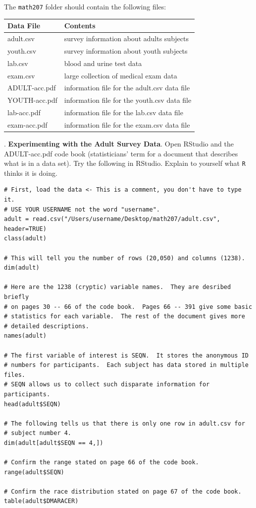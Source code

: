 \documentclass[10pt]{article}
\newcounter{EX}\setcounter{EX}{1}
\newcommand{\EXERCISE}{\arabic{EX}.\stepcounter{EX} }
\begin{document}
The \texttt{math207} folder should contain the following files:\vspace{-6pt}
\begin{center}
\begin{tabular}{|ll|}\hline
Data File & Contents\\\hline
adult.csv  & survey information about adults subjects\\
youth.csv  & survey information about youth subjects\\
lab.csv    & blood and urine test data\\
exam.csv   & large collection of medical exam data\\[4pt]
%
ADULT-acc.pdf & information file for the adult.csv data file\\
YOUTH-acc.pdf & information file for the youth.csv data file\\
lab-acc.pdf   & information file for the lab.csv data file\\
exam-acc.pdf  & information file for the exam.csv data file\\\hline
\end{tabular}
\end{center}\vspace{-3pt}


\EXERCISE \textbf{Experimenting with the Adult Survey Data}. 
Open RStudio and the ADULT-acc.pdf code book (statisticians' term for a 
document that describes what is in a data set).
Try the following in RStudio.  
Explain to yourself what \texttt{R} thinks it is doing.\vspace{-6pt}
\begin{verbatim}
# First, load the data <- This is a comment, you don't have to type it.
# USE YOUR USERNAME not the word "username".
adult = read.csv("/Users/username/Desktop/math207/adult.csv", header=TRUE)
class(adult)

# This will tell you the number of rows (20,050) and columns (1238).
dim(adult)

# Here are the 1238 (cryptic) variable names.  They are desribed briefly
# on pages 30 -- 66 of the code book.  Pages 66 -- 391 give some basic
# statistics for each variable.  The rest of the document gives more
# detailed descriptions.
names(adult)

# The first variable of interest is SEQN.  It stores the anonymous ID
# numbers for participants.  Each subject has data stored in multiple files.
# SEQN allows us to collect such disparate information for participants.
head(adult$SEQN)

# The following tells us that there is only one row in adult.csv for
# subject number 4.
dim(adult[adult$SEQN == 4,])

# Confirm the range stated on page 66 of the code book.
range(adult$SEQN)

# Confirm the race distribution stated on page 67 of the code book.
table(adult$DMARACER)
\end{verbatim}
\end{document}
